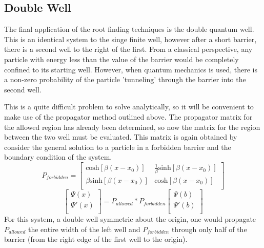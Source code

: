 \documentclass[12pt]{article}
\begin{document}
\subsection{Double Well}
The final application of the root finding techniques is the double quantum well.  This is an identical system to the singe finite well, however after a short barrier, there is a second well to the right of the first.  From a classical perspective, any particle with energy less than the value of the barrier would be completely confined to its starting well.  However, when quantum mechanics is used, there is a non-zero probability of the particle 'tunneling' through the barrier into the second well.  

This is a quite difficult problem to solve analytically, so it will be convenient to make use of the propagator method outlined above.  The propagator matrix for the allowed region has already been determined, so now the matrix for the region between the two well must be evaluated.  This matrix is again obtained by consider the general solution to a particle in a forbidden barrier and the boundary condition of the system.
\[
P_{forbidden} =
\left[ {\begin{array}{cc}
\text{cosh}[\beta(x-x_0)] & \frac{1}{\beta}\text{sinh}[\beta(x-x_0)]  \\
 \beta \text{sinh}[\beta(x-x_0)] & \text{cosh}[\beta(x-x_0)]  \\
\end{array} } \right]
\]
\[
\left[ {\begin{array}{c}
\Psi(x)\\
\Psi'(x) \\
\end{array} } \right] = P_{allowed}*P_{forbidden}
\left[ {\begin{array}{c}
\Psi(b) \\
\Psi'(b)\\
\end{array} } \right]
\]
For this system, a double well symmetric about the origin, one would propagate $P_{allowed}$ the entire width of the left well and $P_{forbidden}$ through only half of the barrier (from the right edge of the first well to the origin).
\end{document}
